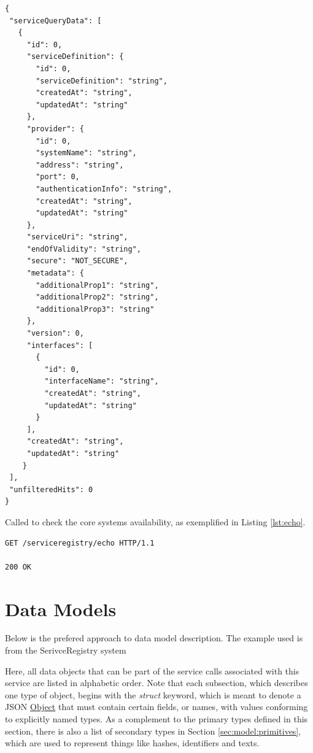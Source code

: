 \documentclass[a4paper]{arrowhead}
\newcommand{\oref}[1]{{\textcolor{ArrowheadBlue}{\hyperref[sec:operations:#1]{#1}}}}
\newcommand{\pref}[1]{{\textcolor{ArrowheadGrey}{\hyperref[sec:model:primitives:#1]{#1}}}}
\begin{document}
\begin{lstlisting}[language=http,label={lst:query_response},caption={A \oref{Query} response. Every \pref{Object} contains an id.}]
{
 "serviceQueryData": [
   {
     "id": 0,
     "serviceDefinition": {
       "id": 0,
       "serviceDefinition": "string",
       "createdAt": "string",
       "updatedAt": "string"
     },
     "provider": {
       "id": 0,
       "systemName": "string",
       "address": "string",
       "port": 0,
       "authenticationInfo": "string",
       "createdAt": "string",
       "updatedAt": "string"
     },
     "serviceUri": "string",
     "endOfValidity": "string",
     "secure": "NOT_SECURE",
     "metadata": {
       "additionalProp1": "string",
       "additionalProp2": "string",
       "additionalProp3": "string"
     },
     "version": 0,
     "interfaces": [
       {
         "id": 0,
         "interfaceName": "string",
         "createdAt": "string",
         "updatedAt": "string"
       }
     ],
     "createdAt": "string",
     "updatedAt": "string"
    }
 ],
 "unfilteredHits": 0
}
\end{lstlisting}


Called to check the core systems availability, as exemplified in Listing \ref{lst:echo}.

\begin{lstlisting}[language=http,label={lst:echo},caption={An \oref{Echo} invocation response.}]
GET /serviceregistry/echo HTTP/1.1

200 OK

\end{lstlisting}
\color{black}


\newpage

\section{Data Models}
\label{sec:model}

\color{red}
Below is the prefered approach to data model description.
The example used is from the SerivceRegistry system

Here, all data objects that can be part of the service calls associated with this service are listed in alphabetic order.
Note that each subsection, which describes one type of object, begins with the \textit{struct} keyword, which is meant to denote a JSON \pref{Object} that must contain certain fields, or names, with values conforming to explicitly named types.
As a complement to the primary types defined in this section, there is also a list of secondary types in Section \ref{sec:model:primitives}, which are used to represent things like hashes, identifiers and texts.
\end{document}
